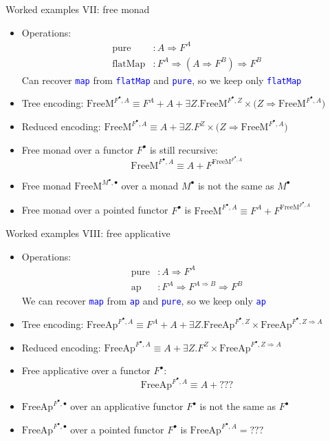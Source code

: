 \documentclass[english,,russian]{beamer}
\begin{document}
\begin{frame}{Worked examples VII: free monad}
\begin{itemize}
\item Operations:
\begin{align*}
\text{pure} & :A\Rightarrow F^{A}\\
\text{flatMap} & :F^{A}\Rightarrow(A\Rightarrow F^{B})\Rightarrow F^{B}
\end{align*}
Can recover \texttt{\textcolor{blue}{\footnotesize{}map}} from \texttt{\textcolor{blue}{\footnotesize{}flatMap}}
and \texttt{\textcolor{blue}{\footnotesize{}pure}}, so we keep only
\texttt{\textcolor{blue}{\footnotesize{}flatMap}} 
\item Tree encoding: $\text{FreeM}^{F^{\bullet},A}\equiv F^{A}+A+\exists Z.\text{FreeM}^{F^{\bullet},Z}\times\big(Z\Rightarrow\text{FreeM}^{F^{\bullet},A}\big)$
\item Reduced encoding: $\text{FreeM}^{F^{\bullet},A}\equiv A+\exists Z.F^{Z}\times\big(Z\Rightarrow\text{FreeM}^{F^{\bullet},A}\big)$
\item Free monad over a functor $F^{\bullet}$ is still recursive: 
\[
\text{FreeM}^{F^{\bullet},A}\equiv A+F^{\text{FreeM}^{F^{\bullet},A}}
\]
\item Free monad $\text{FreeM}^{M^{\bullet},\bullet}$ over a monad $M^{\bullet}$
is not the same as $M^{\bullet}$
\item Free monad over a pointed functor $F^{\bullet}$ is $\text{FreeM}^{F^{\bullet},A}\equiv F^{A}+F^{\text{FreeM}^{F^{\bullet},A}}$
\end{itemize}
\end{frame}

\begin{frame}{Worked examples VIII: free applicative}
\begin{itemize}
\item Operations:
\begin{align*}
\text{pure} & :A\Rightarrow F^{A}\\
\text{ap} & :F^{A}\Rightarrow F^{A\Rightarrow B}\Rightarrow F^{B}
\end{align*}
We can recover \texttt{\textcolor{blue}{\footnotesize{}map}} from
\texttt{\textcolor{blue}{\footnotesize{}ap}} and \texttt{\textcolor{blue}{\footnotesize{}pure}},
so we keep only \texttt{\textcolor{blue}{\footnotesize{}ap}} 
\item Tree encoding: $\text{FreeAp}^{F^{\bullet},A}\equiv F^{A}+A+\exists Z.\text{FreeAp}^{F^{\bullet},Z}\times\text{FreeAp}^{F^{\bullet},Z\Rightarrow A}$
\item Reduced encoding: $\text{FreeAp}^{F^{\bullet},A}\equiv A+\exists Z.F^{Z}\times\text{FreeAp}^{F^{\bullet},Z\Rightarrow A}$
\item Free applicative over a functor $F^{\bullet}$: 
\[
\text{FreeAp}^{F^{\bullet},A}\equiv A+???
\]
\item $\text{FreeAp}^{F^{\bullet},\bullet}$ over an applicative functor
$F^{\bullet}$ is not the same as $F^{\bullet}$
\item $\text{FreeAp}^{F^{\bullet},\bullet}$ over a pointed functor $F^{\bullet}$
is $\text{FreeAp}^{F^{\bullet},A}=???$
\end{itemize}
\end{frame}
\end{document}
